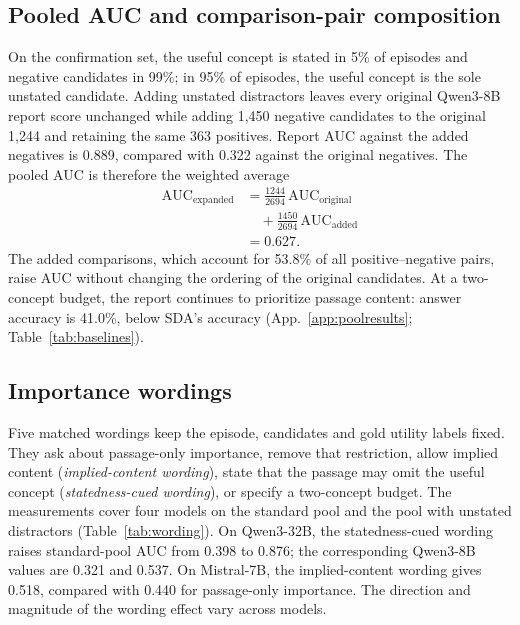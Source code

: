 

\subsection{Pooled AUC and comparison-pair composition}
\label{app:composition}

On the confirmation set, the useful concept is stated in 5\% of
episodes and negative candidates in 99\%; in 95\% of episodes, the
useful concept is the sole unstated candidate. Adding unstated
distractors leaves every original Qwen3-8B report score unchanged
while adding 1,450 negative candidates to the original 1,244 and
retaining the same 363 positives. Report AUC against the added
negatives is 0.889, compared with 0.322 against the original negatives.
The pooled AUC is therefore the weighted average
\begin{equation}
\begin{split}
\mathrm{AUC}_{\mathrm{expanded}}
&=\frac{1244}{2694}\,\mathrm{AUC}_{\mathrm{original}}\\
&\quad+\frac{1450}{2694}\,\mathrm{AUC}_{\mathrm{added}}\\
&=0.627.
\end{split}
\label{eq:pooldecomposition}
\end{equation}
The added comparisons, which account for 53.8\% of all
positive--negative pairs, raise AUC without changing the ordering
of the original candidates. At a two-concept budget, the report
continues to prioritize passage content: answer accuracy is 41.0\%,
below SDA's accuracy (App.~\ref{app:poolresults};
Table~\ref{tab:baselines}).

\subsection{Importance wordings}
\label{app:wording}

Five matched wordings keep the episode, candidates and gold utility
labels fixed. They ask about passage-only importance, remove that
restriction, allow implied content (\emph{implied-content wording}),
state that the passage may omit the useful concept
(\emph{statedness-cued wording}), or specify a two-concept budget.
The measurements cover four models on the standard pool and the
pool with unstated distractors (Table~\ref{tab:wording}).
On Qwen3-32B, the statedness-cued wording raises standard-pool AUC
from 0.398 to 0.876; the corresponding Qwen3-8B values are 0.321 and
0.537. On Mistral-7B, the implied-content wording gives
0.518, compared with 0.440 for passage-only importance. The direction
and magnitude of the wording effect vary across models.

